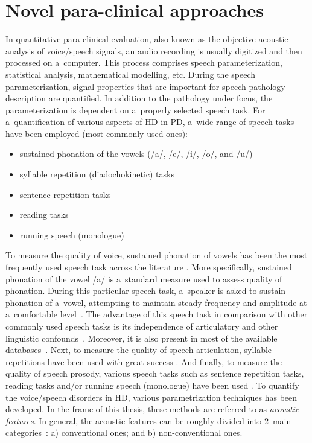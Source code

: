 \section{Novel para-clinical approaches}
\label{ch2_3}

In quantitative para-clinical evaluation, also known as the objective acoustic analysis of voice/speech signals, an audio recording is usually digitized and then processed on a~computer. This process comprises speech parameterization, statistical analysis, mathematical modelling, etc. During the speech parameterization, signal properties that are important for speech pathology description are quantified. In addition to the pathology under focus, the parameterization is dependent on a~properly selected speech task. For a~quantification of various aspects of HD in PD, a~wide range of speech tasks have been employed (most commonly used ones):
\begin{itemize}
	\item sustained phonation of the vowels (/a/, /e/, /i/, /o/, and /u/)
	\item syllable repetition (diadochokinetic) tasks
	\item sentence repetition tasks
	\item reading tasks
	\item running speech (monologue)
\end{itemize}

To measure the quality of voice, sustained phonation of vowels has been the most frequently used speech task across the literature \cite{Tsanas2010b, Astrom2011, Hariharan2014, Smekal2015c, Naranjo2016}. More specifically, sustained phonation of the vowel /a/ is a~standard measure used to assess quality of phonation. During this particular speech task, a~speaker is asked to sustain phonation of a~vowel, attempting to maintain steady frequency and amplitude at a~comfortable level~\cite{Titze1994}. The advantage of this speech task in comparison with other commonly used speech tasks is its independence of articulatory and other linguistic confounds~\cite{Titze1994}. Moreover, it is also present in most of the available databases~\cite{Harar2017, Harar2018}. Next, to measure the quality of speech articulation, syllable repetitions have been used with great success \cite{Lowit2008, Skodda2011d, Skodda2013, Orozco2014a}. And finally, to measure the quality of speech prosody, various speech tasks such as sentence repetition tasks, reading tasks and/or running speech (monologue) have been used \cite{Skodda2011b, Rusz2013b, Bandini2015, Galaz2016}. To quantify the voice/speech disorders in HD, various parametrization techniques has been developed. In the frame of this thesis, these methods are referred to as \textit{acoustic features}. In general, the acoustic features can be roughly divided into $2$~main categories~\cite{Brabenec2017}: a) conventional ones; and b) non-conventional ones.

